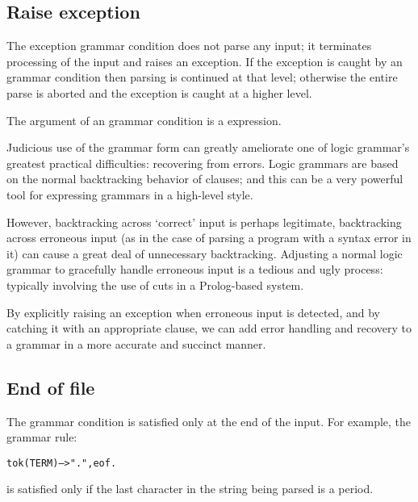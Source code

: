 \subsection{Raise exception}
\label{grammar:raise}

The  exception grammar condition does not parse any input; it terminates processing of the input and raises an exception. If the exception is caught by an  grammar condition then parsing is continued at that level; otherwise the entire parse is aborted and the exception is caught at a higher level.

The argument of an  grammar condition is a  expression.

\begin{aside}
Judicious use of the  grammar form can greatly ameliorate one of logic grammar's greatest practical difficulties: recovering from errors. Logic grammars are based on the normal backtracking behavior of clauses; and this can be a very powerful tool for expressing grammars in a high-level style.

However, backtracking across `correct' input is perhaps legitimate, backtracking across erroneous input (as in the case of parsing a program with a syntax error in it) can cause a great deal of unnecessary backtracking. Adjusting a normal logic grammar to gracefully handle erroneous input is a tedious and ugly process: typically involving the use of cuts in a Prolog-based system.

By explicitly raising an exception when erroneous input is detected, and by catching it with an appropriate  clause, we can add error handling and recovery to a \go grammar in a more accurate and succinct manner.
\end{aside}

\subsection{End of file}
\label{grammar:eof}

The  grammar condition is satisfied only at the end of the input. For example, the grammar rule:
\begin{alltt}
tok(TERM) --> ".", eof.
\end{alltt}
is satisfied only if the last character in the string being parsed is a period.

